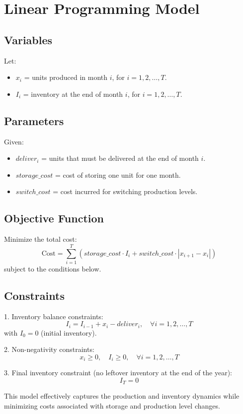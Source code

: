 \documentclass{article}
\begin{document}
\section*{Linear Programming Model}

\subsection*{Variables}
Let:
\begin{itemize}
    \item $x_i$ = units produced in month $i$, for $i = 1, 2, \ldots, T$.
    \item $I_i$ = inventory at the end of month $i$, for $i = 1, 2, \ldots, T$.
\end{itemize}

\subsection*{Parameters}
Given:
\begin{itemize}
    \item $deliver_i$ = units that must be delivered at the end of month $i$.
    \item $storage\_cost$ = cost of storing one unit for one month.
    \item $switch\_cost$ = cost incurred for switching production levels.
\end{itemize}

\subsection*{Objective Function}
Minimize the total cost:
\[
\text{Cost} = \sum_{i=1}^{T} (storage\_cost \cdot I_i + switch\_cost \cdot |x_{i+1} - x_i|)
\]
subject to the conditions below.

\subsection*{Constraints}
1. Inventory balance constraints:
\[
I_i = I_{i-1} + x_i - deliver_i, \quad \forall i = 1, 2, \ldots, T
\]
with $I_0 = 0$ (initial inventory).

2. Non-negativity constraints:
\[
x_i \geq 0, \quad I_i \geq 0, \quad \forall i = 1, 2, \ldots, T
\]

3. Final inventory constraint (no leftover inventory at the end of the year):
\[
I_T = 0
\]

This model effectively captures the production and inventory dynamics while minimizing costs associated with storage and production level changes.
\end{document}
